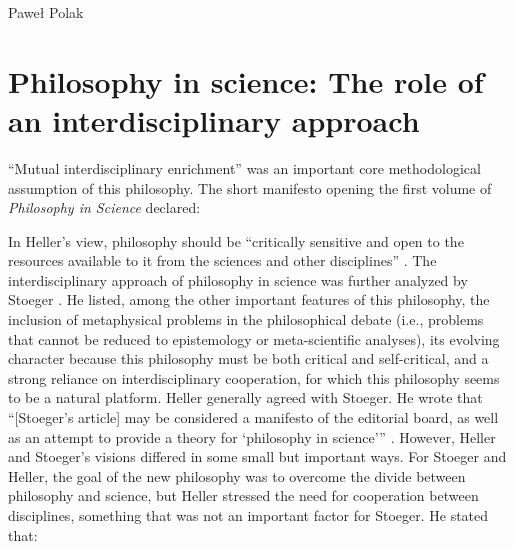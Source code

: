 \begin{artengenv}{Paweł Polak}
\section{Philosophy in science: The role of an interdisciplinary approach}
``Mutual interdisciplinary enrichment''
\parencite[p.7]{pol_heller_introduction_1983}
was an important core methodological
assumption of this philosophy. The short manifesto opening the first volume of \textit{Philosophy in Science} declared:



In Heller’s view, philosophy should be ``critically sensitive and open to the resources available to it from the sciences
and other disciplines''
\parencite[p.9]{pol_heller_introduction_1983}.
The interdisciplinary approach of philosophy in
science was further analyzed by Stoeger
\parencite*{pol_stoeger_evolving_1983}.
He listed, among the other important features of this philosophy, the
inclusion of metaphysical problems in the philosophical debate (i.e., problems that cannot be reduced to epistemology
or meta-scientific analyses), its evolving character because this philosophy must be both critical and self-critical,
and a strong reliance on interdisciplinary cooperation, for which this philosophy seems to be a natural platform.
Heller generally agreed with Stoeger. He wrote that ``[Stoeger’s article] may be considered a manifesto of the editorial
board, as well as an attempt to provide a theory for ‘philosophy in science’''
\parencite[p.\pageref{heller-stoeger}]{pol_heller_how_2019}.
However, Heller
and Stoeger’s visions differed in some small but important ways. For Stoeger and Heller, the goal of the new philosophy
was to overcome the divide between philosophy and science, but Heller stressed the need for cooperation between
disciplines, something that was not an important factor for Stoeger. He stated that: 


\end{artengenv}
